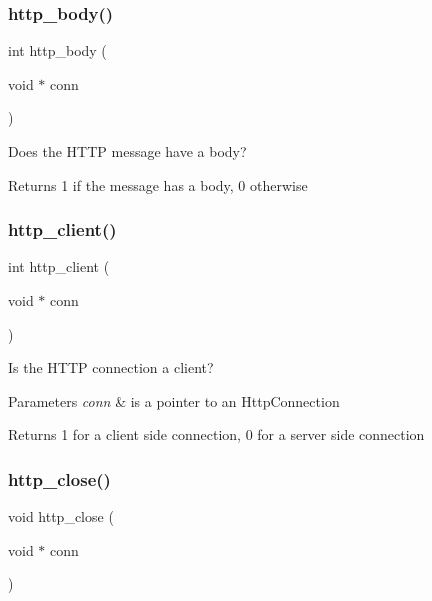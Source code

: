 \subsubsection{\texorpdfstring{http\+\_\+body()}{http\_body()}}
{\footnotesize\ttfamily int http\+\_\+body (\begin{DoxyParamCaption}\item[{void $\ast$}]{conn }\end{DoxyParamCaption})}



Does the H\+T\+TP message have a body? 

\begin{DoxyReturn}{Returns}
1 if the message has a body, 0 otherwise 
\end{DoxyReturn}
\mbox{\label{group__http__connection_gad00b80f2f0573963fb7f6f0227fc748a}} 
\subsubsection{\texorpdfstring{http\+\_\+client()}{http\_client()}}
{\footnotesize\ttfamily int http\+\_\+client (\begin{DoxyParamCaption}\item[{void $\ast$}]{conn }\end{DoxyParamCaption})}



Is the H\+T\+TP connection a client? 


\begin{DoxyParams}{Parameters}
{\em conn} & is a pointer to an Http\+Connection \\
\hline
\end{DoxyParams}
\begin{DoxyReturn}{Returns}
1 for a client side connection, 0 for a server side connection 
\end{DoxyReturn}
\mbox{\label{group__http__connection_ga83590f08e1aeaaa81b2873583ce99dd2}} 
\subsubsection{\texorpdfstring{http\+\_\+close()}{http\_close()}}
{\footnotesize\ttfamily void http\+\_\+close (\begin{DoxyParamCaption}\item[{void $\ast$}]{conn }\end{DoxyParamCaption})}



